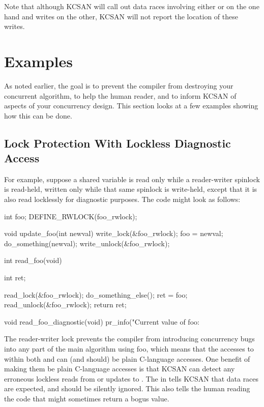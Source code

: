 Note that although KCSAN will call out data races involving either
 or  on the one hand
and  writes on the other, KCSAN will not report the location
of these  writes.


\section{Examples}

As noted earlier, the goal is to prevent the compiler from destroying
your concurrent algorithm, to help the human reader, and to inform
KCSAN of aspects of your concurrency design.
This section looks at a few examples showing how this can be done.


\subsection{Lock Protection With Lockless Diagnostic Access}

For example, suppose a shared variable  is read only while a
reader-writer spinlock is read-held, written only while that same
spinlock is write-held, except that it is also read locklessly for
diagnostic purposes.  The code might look as follows:

\begin{VerbatimU}[samepage=false]
	int foo;
	DEFINE_RWLOCK(foo_rwlock);

	void update_foo(int newval)
	{
		write_lock(&foo_rwlock);
		foo = newval;
		do_something(newval);
		write_unlock(&foo_rwlock);
	}

	int read_foo(void)
	{
		int ret;

		read_lock(&foo_rwlock);
		do_something_else();
		ret = foo;
		read_unlock(&foo_rwlock);
		return ret;
	}

	void read_foo_diagnostic(void)
	{
		pr_info("Current value of foo: %
	}
\end{VerbatimU}

The reader-writer lock prevents the compiler from introducing concurrency
bugs into any part of the main algorithm using foo, which means that
the accesses to  within both  and 
can (and should) be plain C-language accesses.
One benefit of making them be plain C-language accesses is that KCSAN can
detect any erroneous lockless reads from or updates to .
The  in  tells KCSAN that data
races are expected, and should be silently ignored.
This  also tells the human reading the code that
 might sometimes return a bogus value.


